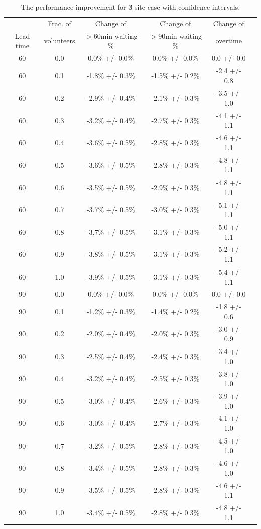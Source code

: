 \begin{table}[ht]
\centering
\begin{tabular}{cccccc}
  \hline
  & Frac. of & Change of & Change of & Change of \\
Lead time & volunteers & $>$60min waiting \% & $>$90min waiting \% & overtime \\ 
  \hline
60 & 0.0 & 0.0\% +/- 0.0\% & 0.0\% +/- 0.0\% & 0.0 +/- 0.0 \\ 
  60 & 0.1 & -1.8\% +/- 0.3\% & -1.5\% +/- 0.2\% & -2.4 +/- 0.8 \\ 
  60 & 0.2 & -2.9\% +/- 0.4\% & -2.1\% +/- 0.3\% & -3.5 +/- 1.0 \\ 
  60 & 0.3 & -3.2\% +/- 0.4\% & -2.7\% +/- 0.3\% & -4.1 +/- 1.1 \\ 
  60 & 0.4 & -3.6\% +/- 0.5\% & -2.8\% +/- 0.3\% & -4.6 +/- 1.1 \\ 
  60 & 0.5 & -3.6\% +/- 0.5\% & -2.8\% +/- 0.3\% & -4.8 +/- 1.1 \\ 
  60 & 0.6 & -3.5\% +/- 0.5\% & -2.9\% +/- 0.3\% & -4.8 +/- 1.1 \\ 
  60 & 0.7 & -3.7\% +/- 0.5\% & -3.0\% +/- 0.3\% & -5.1 +/- 1.1 \\ 
  60 & 0.8 & -3.7\% +/- 0.5\% & -3.1\% +/- 0.3\% & -5.0 +/- 1.1 \\ 
  60 & 0.9 & -3.8\% +/- 0.5\% & -3.1\% +/- 0.3\% & -5.2 +/- 1.1 \\ 
  60 & 1.0 & -3.9\% +/- 0.5\% & -3.1\% +/- 0.3\% & -5.4 +/- 1.1 \\ 
  90 & 0.0 & 0.0\% +/- 0.0\% & 0.0\% +/- 0.0\% & 0.0 +/- 0.0 \\ 
  90 & 0.1 & -1.2\% +/- 0.3\% & -1.4\% +/- 0.2\% & -1.8 +/- 0.6 \\ 
  90 & 0.2 & -2.0\% +/- 0.4\% & -2.0\% +/- 0.3\% & -3.0 +/- 0.9 \\ 
  90 & 0.3 & -2.5\% +/- 0.4\% & -2.4\% +/- 0.3\% & -3.4 +/- 1.0 \\ 
  90 & 0.4 & -3.2\% +/- 0.4\% & -2.5\% +/- 0.3\% & -3.8 +/- 1.0 \\ 
  90 & 0.5 & -3.0\% +/- 0.4\% & -2.6\% +/- 0.3\% & -3.9 +/- 1.0 \\ 
  90 & 0.6 & -3.0\% +/- 0.4\% & -2.7\% +/- 0.3\% & -4.1 +/- 1.0 \\ 
  90 & 0.7 & -3.2\% +/- 0.5\% & -2.8\% +/- 0.3\% & -4.5 +/- 1.0 \\ 
  90 & 0.8 & -3.4\% +/- 0.5\% & -2.8\% +/- 0.3\% & -4.6 +/- 1.0 \\ 
  90 & 0.9 & -3.5\% +/- 0.5\% & -2.8\% +/- 0.3\% & -4.6 +/- 1.1 \\ 
  90 & 1.0 & -3.4\% +/- 0.5\% & -2.8\% +/- 0.3\% & -4.8 +/- 1.1 \\ 
   \hline
\end{tabular}
\caption{The performance improvement for 3 site case with confidence intervals.}
\label{table:3site}
\end{table}

